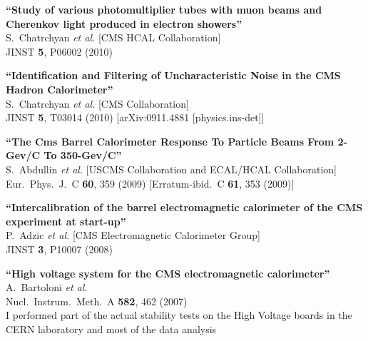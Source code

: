 \documentclass[10pt, a4paper]{article}
\begin{document}
\begin{thebibliography}{599}

{\bf ``Study of various photomultiplier tubes with muon beams and Cherenkov light produced in electron showers''}
  \\{}S.~Chatrchyan {\it et al.}  [CMS HCAL Collaboration]
  \\{}JINST {\bf 5}, P06002 (2010)

{\bf ``Identification and Filtering of Uncharacteristic Noise in the CMS Hadron Calorimeter''}
  \\{}S.~Chatrchyan {\it et al.}  [CMS Collaboration]
  \\{}JINST {\bf 5}, T03014 (2010)
  [arXiv:0911.4881 [physics.ins-det]]

{\bf ``The Cms Barrel Calorimeter Response To Particle Beams From 2-Gev/C To 350-Gev/C''}
  \\{}S.~Abdullin {\it et al.}  [USCMS Collaboration and ECAL/HCAL
                  Collaboration]
  \\{}Eur.\ Phys.\ J.\  C {\bf 60}, 359 (2009)
  [Erratum-ibid.\  C {\bf 61}, 353 (2009)]

{\bf ``Intercalibration of the barrel electromagnetic calorimeter of the CMS  experiment at start-up''}
  \\{}P.~Adzic {\it et al.}  [CMS Electromagnetic Calorimeter Group]
  \\{}JINST {\bf 3}, P10007 (2008)

{\bf ``High voltage system for the CMS electromagnetic calorimeter''}
  \\{}A.~Bartoloni {\it et al.}
  \\{}Nucl.\ Instrum.\ Meth.\  A {\bf 582}, 462 (2007)
  \\ I performed part of the actual stability tests on the High Voltage boards in the CERN laboratory and most of the data analysis 


\end{thebibliography}
\end{document}
